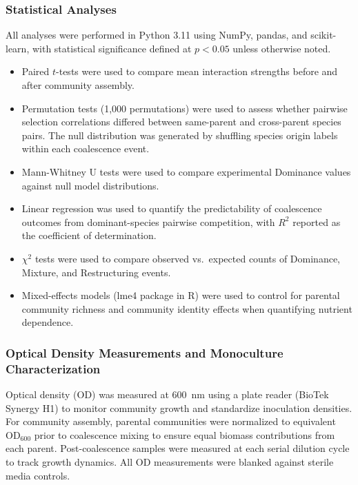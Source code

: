 \subsubsection*{Statistical Analyses}
\label{sec:suppl:statistics}

All analyses were performed in Python 3.11 using NumPy, pandas, and scikit-learn, with statistical significance defined at $p < 0.05$ unless otherwise noted.

\begin{itemize}
    \item Paired $t$-tests were used to compare mean interaction strengths before and after community assembly.
    \item Permutation tests (1,000 permutations) were used to assess whether pairwise selection correlations differed between same-parent and cross-parent species pairs. The null distribution was generated by shuffling species origin labels within each coalescence event.
    \item Mann-Whitney U tests were used to compare experimental Dominance values against null model distributions.
    \item Linear regression was used to quantify the predictability of coalescence outcomes from dominant-species pairwise competition, with $R^2$ reported as the coefficient of determination.
    \item $\chi^2$ tests were used to compare observed vs.\ expected counts of Dominance, Mixture, and Restructuring events.
    \item Mixed-effects models (lme4 package in R) were used to control for parental community richness and community identity effects when quantifying nutrient dependence.
\end{itemize}


\subsubsection*{Optical Density Measurements and Monoculture Characterization}
\label{sec:suppl:od}

Optical density (OD) was measured at 600~nm using a plate reader (BioTek Synergy H1) to monitor community growth and standardize inoculation densities. For community assembly, parental communities were normalized to equivalent OD$_{600}$ prior to coalescence mixing to ensure equal biomass contributions from each parent. Post-coalescence samples were measured at each serial dilution cycle to track growth dynamics. All OD measurements were blanked against sterile media controls.

